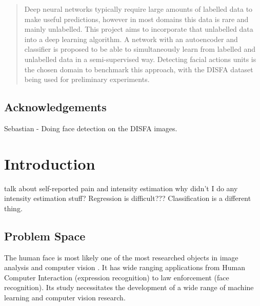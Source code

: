\documentclass[11pt,twoside]{report}
\date{September 2016}
\begin{document}



\clearpage{\pagestyle{empty}\cleardoublepage}
\setcounter{page}{1}
\pagestyle{fancy}

\begin{abstract}
  Deep neural networks typically require large amounts of labelled data to make useful
  predictions, however in most domains this data is rare and mainly unlabelled.
  This project aims to incorporate that unlabelled data into a deep learning algorithm.
  A network with an autoencoder and classifier is proposed to be able to simultaneously
  learn from labelled and unlabelled data in a semi-supervised way. Detecting
  facial actions units is the chosen domain to benchmark this approach, with
  the DISFA dataset being used for preliminary experiments.
\end{abstract}

\cleardoublepage
\section*{Acknowledgements}
Sebastian - Doing face detection on the DISFA images.

\clearpage{\pagestyle{empty}\cleardoublepage}

\tableofcontents


\clearpage{\pagestyle{empty}\cleardoublepage}
\setcounter{page}{1}
\fancyhead[LE,RO]{\slshape \rightmark}
\fancyhead[LO,RE]{\slshape \leftmark}

\chapter{Introduction}
talk about self-reported pain and intensity estimation
why didn't I do any intensity estimation stuff?
Regression is difficult??? Classification is a different thing.
\section{Problem Space}
The human face is most likely one of the most researched objects in image analysis
and computer vision \cite{S.ZafeiriouA.PapaioannouI.KotsiaM.A.Nicolaou}.
It has wide ranging applications from Human
Computer Interaction (expression recognition) to law enforcement (face recognition).
Its study necessitates the development of a wide range of machine
learning and computer vision research.
\end{document}
